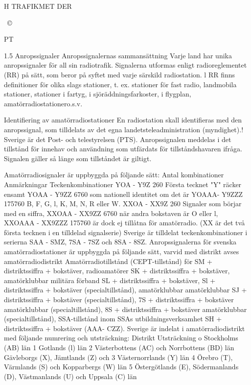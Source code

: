 H TRAFIKMET DER

~©~

PT

1.5 Anropssignaler
Anropssignalernas sammansättning
Varje land har unika anropssignaler för all
sin radiotrafik. Signalerna utformas enligt
radioreglementet (RR) på sätt, som beror på
syftet med varje särskild radiostation. l RR
finns definitioner för olika slags stationer,
t. ex. stationer för fast radio, landmobila stationer, stationer i fartyg, i sjöräddningsfarkoster, i flygplan, amatörradiostationero.s.v.

Identifiering av amatörradiostationer
En radiostation skall identifieras med den
anropssignal, som tilldelats av det egna landetsteleadministration (myndighet).! Sverige
är det Post- och telestyrelsen (PTS).
Anropssignalen meddelas i det tillstånd för
innehav och användning som utfärdats för
tillståndshavaren ifråga. Signalen gäller så
länge som tillståndet är giltigt.

Amatörradiosignaler är uppbyggda på följande sätt:
Antal kombinationer Anmärkningar
Teckenkombinationer
YOA - Y9Z
260
Första tecknet "Y" räcker ensamt
YOAA - Y9ZZ
6760
som nationell identitet om det är
YOAAA- Y9ZZZ
175760
B, F, G, l, K, M, N, R eller W.
XXOA - XX9Z
260
Signaler som börjar med en siffra,
XXOAA - XX9ZZ
6760
när andra bokstaven är O eller l,
XXOAAA - XX9ZZZ
175760
är dock ej tillåtna för amatörradio.
(XX är det två första tecknen i en tilldelad signalserie)
Sverige är tilldelat teckenkombinationer i serierna SAA - SMZ, 7SA - 7SZ och 8SA - 8SZ.
Anropssignalerna för svenska amatörradiostationer är uppbyggda på följande sätt, varvid
med distrikt avses amatörradiodistrikt
Amatörradiotillstånd (CEPT-tillstånd) för
SM + distriktssiffra + bokstäver,
radioamatörer
SK + distriktssiffra + bokstäver,
amatörklubbar
militära förband
SL + distriktssiffra + bokstäver,
Sl + distriktssiffra + bokstäver
(specialtillstånd),
amatörklubbar
amatörklubbar
SJ + distriktssiffra + bokstäver
(specialtillstånd),
7S + distriktssiffra + bokstäver
amatörklubbar
(specialtillstånd),
8S + distriktssiffra + bokstäver
amatörklubbar
(specialtillstånd),
SSA-tillstånd inom SSAs utbildningsverksamhet
SH + distriktssiffra + bokstäver (AAA- CZZ).
Sverige är indelat i amatörradiodistrikt med följande numrering och utsträckning:
Distrikt Utsträckning
o Stockholms (AB) län
1
Gotlands (l) län
2
Västerbottens (AC) och
Norrbottens (BD) län
Gävleborgs (X), Jämtlands (Z) och
3
Västernorrlands (Y) län
4
Örebro (T), Värmlands (S) och
Kopparbergs (W) län
5
Östergötlands (E), Södermanlands
(D), Västmanlands (U) och Uppsala
(C) län


